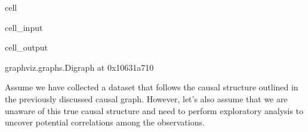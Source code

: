 \documentclass[letterpaper,10pt,english]{jupyterBook}
\begin{document}
\begin{sphinxuseclass}{cell}\begin{sphinxVerbatimInput}

\begin{sphinxuseclass}{cell_input}
\begin{sphinxVerbatim}[commandchars=\\\{\}]
 
   

  

 
 
 

 
 

\end{sphinxVerbatim}

\end{sphinxuseclass}\end{sphinxVerbatimInput}
\begin{sphinxVerbatimOutput}

\begin{sphinxuseclass}{cell_output}
\begin{sphinxVerbatim}[commandchars=\\\{\}]
\PYGZlt{}graphviz.graphs.Digraph at 0x10631a710\PYGZgt{}
\end{sphinxVerbatim}

\end{sphinxuseclass}\end{sphinxVerbatimOutput}

\end{sphinxuseclass}
\sphinxAtStartPar
Assume we have collected a dataset that follows the causal structure outlined in the previously discussed causal graph. However, let’s also assume that we are unaware of this true causal structure and need to perform exploratory analysis to uncover potential correlations among the observations.
\end{document}
